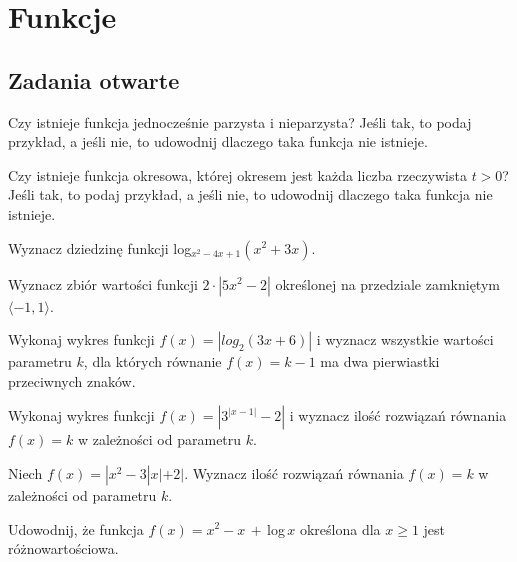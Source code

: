 \setcounter{parc}{0}
\addtocounter{chapc}{1}

\chapter{Funkcje}

\section{Zadania otwarte}

\zadanie Czy istnieje funkcja jednocześnie parzysta i nieparzysta? Jeśli tak, to podaj przykład, a jeśli nie, to udowodnij dlaczego taka funkcja nie istnieje.

\zadanie Czy istnieje funkcja okresowa, której okresem jest każda liczba rzeczywista $t > 0$? Jeśli tak, to podaj przykład, a jeśli nie, to udowodnij dlaczego taka funkcja nie istnieje.

\zadanie Wyznacz dziedzinę funkcji log$_{x^2 - 4x + 1}(x^2 + 3x)$.

\zadanie Wyznacz zbiór wartości funkcji $2\cdot|5x^2 - 2|$ określonej na przedziale zamkniętym $\langle -1, 1 \rangle$.

\zadanie Wykonaj wykres funkcji $f(x) = |log_2(3x + 6)|$ i wyznacz wszystkie wartości parametru $k$, dla których równanie $f(x) = k - 1$ ma dwa pierwiastki przeciwnych znaków.

\zadanie Wykonaj wykres funkcji $f(x) = |3^{|x - 1|} - 2|$ i wyznacz ilość rozwiązań równania $f(x) = k$ w zależności od parametru $k$.

\zadanie Niech $f(x) = |x^2 -3|x| + 2|$. Wyznacz ilość rozwiązań równania $f(x) = k$ w zależności od parametru $k$.

\zadanie Udowodnij, że funkcja $f(x) = x^2 - x\,+\,$log$\,x$ określona dla $x \geq 1$ jest różnowartościowa.

